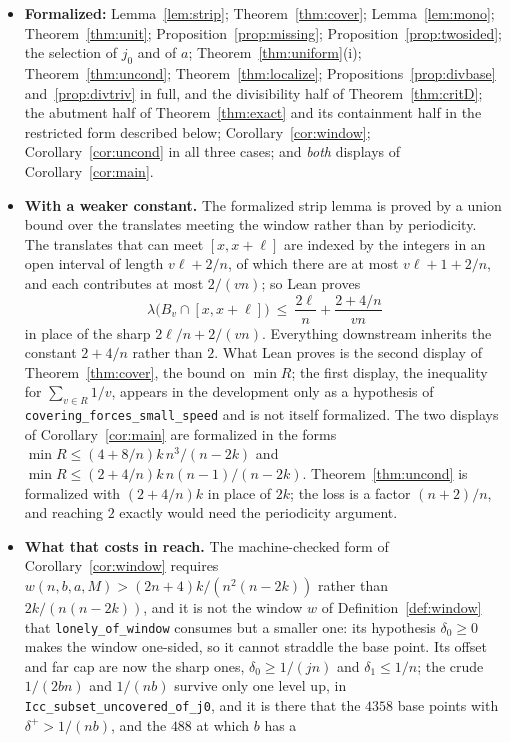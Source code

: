 \documentclass[11pt]{amsart}
\theoremstyle{plain}
\theoremstyle{definition}
\begin{document}
\begin{itemize}
\item \textbf{Formalized:} Lemma~\ref{lem:strip}; Theorem~\ref{thm:cover}; Lemma~\ref{lem:mono};
Theorem~\ref{thm:unit}; Proposition~\ref{prop:missing}; Proposition~\ref{prop:twosided}; the
selection of $j_0$ and of $a$; Theorem~\ref{thm:uniform}(i); Theorem~\ref{thm:uncond};
Theorem~\ref{thm:localize}; Propositions~\ref{prop:divbase} and~\ref{prop:divtriv} in full, and
the divisibility half of Theorem~\ref{thm:critD}; the abutment half of Theorem~\ref{thm:exact} and its containment
half in the restricted form described below; Corollary~\ref{cor:window};
Corollary~\ref{cor:uncond} in all three cases; and \emph{both} displays of
Corollary~\ref{cor:main}.
\item \textbf{With a weaker constant.} The formalized strip lemma is proved by a union bound over
the translates meeting the window rather than by periodicity. The translates that can meet
$[x,x+\ell]$ are indexed by the integers in an open interval of length $v\ell+2/n$, of which there
are at most $v\ell+1+2/n$, and each contributes at most $2/(vn)$; so Lean proves
\[
  \lambda\bigl(B_v\cap[x,x+\ell]\bigr)\ \le\ \frac{2\ell}{n}+\frac{2+4/n}{vn}
\]
in place of the sharp $2\ell/n+2/(vn)$. Everything downstream inherits the constant $2+4/n$ rather
than $2$. What Lean proves is the second display of Theorem~\ref{thm:cover}, the bound on
$\min R$; the first display, the inequality for $\sum_{v\in R}1/v$, appears in the development only
as a hypothesis of \texttt{covering\_forces\_small\_speed} and is not itself formalized. The two
displays of Corollary~\ref{cor:main} are formalized in the forms $\min R\le(4{+}8/n)k\,n^{3}/(n-2k)$
and
$\min R\le(2{+}4/n)k\,n(n-1)/(n-2k)$. Theorem~\ref{thm:uncond} is formalized with $(2+4/n)k$ in
place of $2k$; the loss is a factor $(n+2)/n$, and reaching $2$ exactly would need the periodicity
argument.
\item \textbf{What that costs in reach.} The machine-checked form of Corollary~\ref{cor:window}
requires $w(n,b,a,M)>(2n+4)k/(n^{2}(n-2k))$ rather than $2k/(n(n-2k))$, and it is not the window
$w$ of Definition~\ref{def:window} that \texttt{lonely\_of\_window} consumes but a smaller one: its
hypothesis $\delta_0\ge0$ makes the window one-sided, so it cannot straddle the base point. Its
offset and far cap are now the sharp ones, $\delta_0\ge1/(jn)$ and $\delta_1\le1/n$; the crude
$1/(2bn)$ and $1/(nb)$ survive only one level up, in \texttt{Icc\_subset\_uncovered\_of\_j0}, and it
is there that the $4358$ base points with $\delta^{+}>1/(nb)$, and the $488$ at which $b$ has a

\end{itemize}
\end{document}
